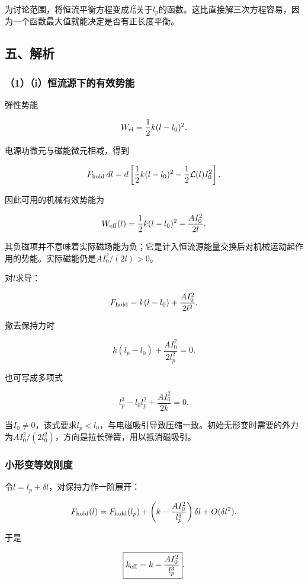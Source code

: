 \documentclass[12pt,a4paper,fontset=fandol]{ctexart}
\begin{document}
为讨论范围，将恒流平衡方程变成\(I_0^2\)关于\(l_p\)的函数。这比直接解三次方程容易，因为一个函数最大值就能决定是否有正长度平衡。

\subsection{五、解析}\label{ux4e94ux89e3ux6790-1}

\subsubsection{（1）（i）恒流源下的有效势能}\label{iux6052ux6d41ux6e90ux4e0bux7684ux6709ux6548ux52bfux80fd}

弹性势能

\[
W_{\rm el}=\frac12k(l-l_0)^2.
\]

电源功微元与磁能微元相减，得到

\[
F_{\rm hold}\,dl
=d\left[\frac12k(l-l_0)^2
-\frac12\mathcal L(l)I_0^2\right].
\]

因此可用的机械有效势能为

\[
W_{\rm eff}(l)=\frac12k(l-l_0)^2-\frac{AI_0^2}{2l}.
\]

其负磁项并不意味着实际磁场能为负；它是计入恒流源能量交换后对机械运动起作用的势能。实际磁能仍是\(AI_0^2/(2l)>0\)。

对\(l\)求导：

\[
F_{\rm hold}=k(l-l_0)+\frac{AI_0^2}{2l^2}.
\]

撤去保持力时

\[
\boxed{k(l_p-l_0)+\frac{AI_0^2}{2l_p^2}=0}.
\]

也可写成多项式

\[
\boxed{l_p^3-l_0l_p^2+\frac{AI_0^2}{2k}=0}.
\]

当\(I_0\neq0\)，该式要求\(l_p<l_0\)，与电磁吸引导致压缩一致。初始无形变时需要的外力为\(AI_0^2/(2l_0^2)\)，方向是拉长弹簧，用以抵消磁吸引。

\subsubsection{小形变等效刚度}\label{ux5c0fux5f62ux53d8ux7b49ux6548ux521aux5ea6}

令\(l=l_p+\delta l\)，对保持力作一阶展开：

\[
F_{\rm hold}(l)
=F_{\rm hold}(l_p)
+\left(k-\frac{AI_0^2}{l_p^3}\right)\delta l
+O(\delta l^2).
\]

于是

\[
\boxed{k_{\rm eff}=k-\frac{AI_0^2}{l_p^3}}.
\]
\end{document}
